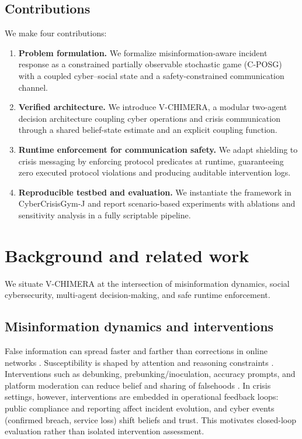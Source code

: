 \documentclass[referee,lineno,sn-basic]{sn-jnl}
\newcommand{\model}{V-CHIMERA}
\newcommand{\envname}{CyberCrisisGym-J}
\begin{document}
\subsection{Contributions}
We make four contributions:
\begin{enumerate}[leftmargin=*]
  \item \textbf{Problem formulation.} We formalize misinformation-aware incident response as a constrained partially observable stochastic game (C-POSG) with a coupled cyber--social state and a safety-constrained communication channel.
  \item \textbf{Verified architecture.} We introduce \model{}, a modular two-agent decision architecture coupling cyber operations and crisis communication through a shared belief-state estimate and an explicit coupling function.
  \item \textbf{Runtime enforcement for communication safety.} We adapt shielding to crisis messaging by enforcing protocol predicates at runtime, guaranteeing zero executed protocol violations and producing auditable intervention logs.
  \item \textbf{Reproducible testbed and evaluation.} We instantiate the framework in \envname{} and report scenario-based experiments with ablations and sensitivity analysis in a fully scriptable pipeline.
\end{enumerate}

\section{Background and related work}
We situate \model{} at the intersection of misinformation dynamics, social cybersecurity, multi-agent decision-making, and safe runtime enforcement.

\subsection{Misinformation dynamics and interventions}
False information can spread faster and farther than corrections in online networks \citep{vosoughi2018spread,lazer2018science}. Susceptibility is shaped by attention and reasoning constraints \citep{pennycook2019lazy}. Interventions such as debunking, prebunking/inoculation, accuracy prompts, and platform moderation can reduce belief and sharing of falsehoods \citep{kozyreva2024toolbox,lewandowsky2021inoculation,ng2021platform}. In crisis settings, however, interventions are embedded in operational feedback loops: public compliance and reporting affect incident evolution, and cyber events (confirmed breach, service loss) shift beliefs and trust. This motivates closed-loop evaluation rather than isolated intervention assessment.
\end{document}
